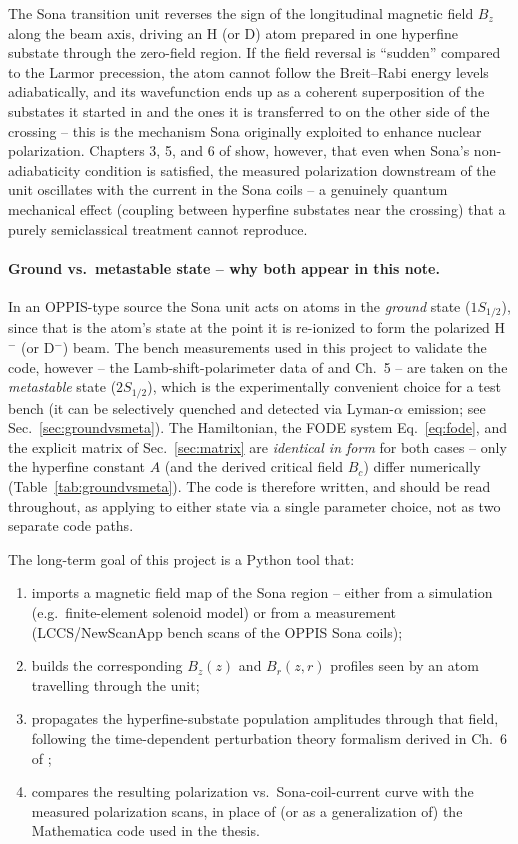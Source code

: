 \documentclass[11pt,a4paper]{article}
\begin{document}
The Sona transition unit reverses the sign of the longitudinal magnetic field
$B_z$ along the beam axis, driving an H (or D) atom prepared in one hyperfine
substate through the zero-field region. If the field reversal is ``sudden''
compared to the Larmor precession, the atom cannot follow the Breit--Rabi
energy levels adiabatically, and its wavefunction ends up as a coherent
superposition of the substates it started in and the ones it is transferred
to on the other side of the crossing -- this is the mechanism Sona
originally exploited to enhance nuclear polarization. Chapters 3, 5, and 6
of \cite{kannis2023} show, however, that even when Sona's non-adiabaticity
condition is satisfied, the measured polarization downstream of the unit
oscillates with the current in the Sona coils -- a genuinely quantum
mechanical effect (coupling between hyperfine substates near the crossing)
that a purely semiclassical treatment cannot reproduce.

\paragraph{Ground vs.\ metastable state -- why both appear in this note.}
In an OPPIS-type source the Sona unit acts on atoms in the \emph{ground}
state ($1S_{1/2}$), since that is the atom's state at the point it is
re-ionized to form the polarized H$^-$ (or D$^-$) beam. The bench
measurements used in this project to validate the code, however -- the
Lamb-shift-polarimeter data of \cite{kannis2022spin} and \cite{kannis2023}
Ch.~5 -- are taken on the \emph{metastable} state ($2S_{1/2}$), which is
the experimentally convenient choice for a test bench (it can be
selectively quenched and detected via Lyman-$\alpha$ emission; see
Sec.~\ref{sec:groundvsmeta}). The Hamiltonian, the FODE system
Eq.~\eqref{eq:fode}, and the explicit matrix of Sec.~\ref{sec:matrix} are
\emph{identical in form} for both cases -- only the hyperfine constant $A$
(and the derived critical field $B_c$) differ numerically
(Table~\ref{tab:groundvsmeta}). The code is therefore written, and should
be read throughout, as applying to either state via a single parameter
choice, not as two separate code paths.

The long-term goal of this project is a Python tool that:
\begin{enumerate}
    \item imports a magnetic field map of the Sona region -- either from
    a simulation (e.g.\ finite-element solenoid model) or from a
    measurement (LCCS/NewScanApp bench scans of the OPPIS Sona coils);
    \item builds the corresponding $B_z(z)$ and $B_r(z,r)$ profiles seen
    by an atom travelling through the unit;
    \item propagates the hyperfine-substate population amplitudes through
    that field, following the time-dependent perturbation theory
    formalism derived in Ch.~6 of \cite{kannis2023};
    \item compares the resulting polarization vs.\ Sona-coil-current curve
    with the measured polarization scans, in place of (or as a
    generalization of) the Mathematica code used in the thesis.
\end{enumerate}
\end{document}

